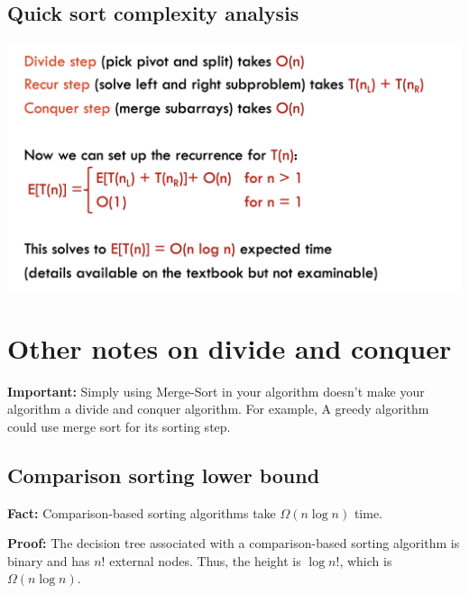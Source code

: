 \documentclass[12pt]{article}
\newcommand{\1}{\space \quad}
\newcommand{\2}{\quad \quad \quad}
\newcommand{\3}{\quad \quad \quad \quad \space}
\newcommand{\4}{\quad \quad \quad \quad \quad \quad}
\newcommand{\5}{\quad \quad \quad \quad \quad \quad \quad \space}
\begin{document}
\subsection{Quick sort complexity analysis}
\includegraphics[width=\textwidth]{image35.png} 

\section{Other notes on divide and conquer}

\textbf{Important:}
Simply using Merge-Sort in your algorithm doesn’t make your algorithm a divide and conquer algorithm. 
For example, A greedy algorithm could use merge sort for its sorting step.

\subsection{Comparison sorting lower bound}
\textbf{Fact:} Comparison-based sorting algorithms take $\Omega(n \log n)$ time.

\vspace{10pt}
\textbf{Proof:}
The decision tree associated with a comparison-based sorting algorithm is binary and has $n!$ external nodes. Thus, the height is $\log n!$, which is $\Omega(n \log n)$.
\end{document}

